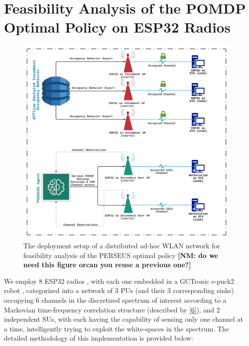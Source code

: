 \documentclass[12pt, draftcls, onecolumn]{IEEEtran}
\newcommand{\nm}[1]{{\color{blue}\bf{[NM: #1]}}}
\begin{document}
\section{Feasibility Analysis of the POMDP Optimal Policy on ESP32 Radios}\label{D}
\begin{figure} [htb]
    \centerline{
    \includegraphics[width = 0.8\linewidth]{figures/Minerva_ESP32_Deployment_Model.png}}
    \caption{The deployment setup of a distributed ad-hoc WLAN network for feasibility analysis of the PERSEUS optimal policy \nm{do we need this figure orcan you reuse a previous one?}}
    \label{fig: C. 0}
\end{figure}
We employ $8$ ESP32 radios \cite{Espressif:ESP32}, with each one embedded in a GCTronic e-puck2 robot \cite{GCTronic:epuck2}, categorized into a network of $3$ PUs (and their $3$ corresponding sinks) occupying $6$ channels in the discretized spectrum of interest according to a Markovian time-frequency correlation structure (described by \eqref{6}), and $2$ independent SUs, with each having the capability of sensing only one channel at a time, intelligently trying to exploit the white-spaces in the spectrum. The detailed methodology of this implementation is provided below:
\end{document}
